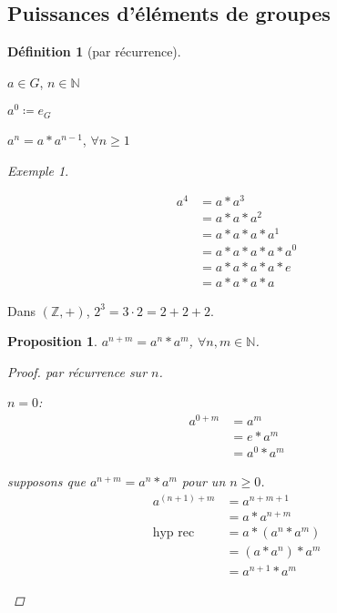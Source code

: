 \documentclass{report}
\newcommand*{\gte}{\geqslant}
\newcommand*{\entiers}{\mathbb{Z}}
\newcommand*{\naturels}{\mathbb{N}}
\newtheorem*{prop}{Proposition}
\theoremstyle{definition}
\newtheorem*{defin}{D\'efinition}
\theoremstyle{remark}
\newtheorem*{exem}{Exemple}
\begin{document}
	\subsection{Puissances d'\'el\'ements de groupes}
	\begin{defin}[par r\'ecurrence]~

		$a \in G$, $n \in \naturels$
		\begin{nlist}
			\item $a^0 \coloneq e_G$
			\item $a^n=a*a^{n-1}$, $\forall n \gte 1$
		\end{nlist}
	\end{defin}
	\begin{exem}~

		\begin{ulist}
			\item \begin{align*}
				a^4&= a*a^3\\
				&= a*a*a^2\\
				&= a*a*a*a^1\\
				&= a*a*a*a*a^0\\
				&= a*a*a*a*e\\
				&= a*a*a*a
			\end{align*}
			\item Dans $(\entiers,+)$, $2^3=3 \cdot 2=2+2+2$.
		\end{ulist}
	\end{exem}
	\begin{prop}
		$a^{n+m}=a^n*a^m$, $\forall n,m \in \naturels$.
		\begin{proof}
			par r\'ecurrence sur $n$.

			\begin{nlist}
				\item $n=0$:
				\begin{align*}
					a^{0+m}&= a^m\\
					&= e*a^m\\
					&= a^0*a^m
				\end{align*}
				\item supposons que $a^{n+m}=a^n*a^m$ pour un $n \gte 0$.
				\begin{align*}
					a^{(n+1)+m}&= a^{n+m+1}\\
					&= a*a^{n+m}\\
					\text{hyp rec}&= a*(a^n*a^m)\\
					&= (a*a^n)*a^m\\
					&= a^{n+1}*a^m
				\end{align*}
			\end{nlist}
		\end{proof}
	\end{prop}
\end{document}
